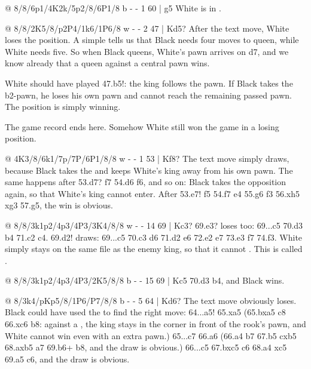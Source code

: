 @ 8/8/6p1/4K2k/5p2/8/6P1/8 b - - 1 60 | g5
White is in .

@ 8/8/2K5/8/p2P4/1k6/1P6/8 w - - 2 47 | Kd5?
After the text move, White loses the position. A simple 
tells us that Black needs four moves to queen, while White needs five. So when Black queens, White's
pawn arrives on d7, and we know already that a queen against a central pawn wins.

White should have played 47.\K b5!: the king follows the pawn. If Black takes the b2-pawn, he loses
his own pawn and cannot reach the remaining passed pawn. The position is simply winning.

The game record ends here. Somehow White still won the game in a losing position.

@ 4K3/8/6k1/7p/7P/6P1/8/8 w - - 1 53 | Kf8?
The text move simply draws, because Black takes the
 and keeps White's king away from his own
pawn. The same happens after 53.\K d7? \K f7 54.\K d6 \K f6, and so on: Black takes the opposition
again, so that White's king cannot enter. After 53.\K e7! \K f5 54.\K f7 \K e4 55.\K g6 \K f3
56.\K xh5 \K xg3 57.\K g5, the win is obvious.

@ 8/8/3k1p2/4p3/4P3/3K4/8/8 w - - 14 69 | Kc3?
69.\K e3? loses too: 69...\K c5 70.\K d3 \K b4 71.\K c2 \K c4. 69.\K d2! draws: 69...\K c5 70.\K c3
\K d6 71.\K d2 \K e6 72.\K e2 \K e7 73.\K e3 \K f7 74.\K f3. White simply stays on the same file as
the enemy king, so that it cannot . This is called
.

@ 8/8/3k1p2/4p3/4P3/2K5/8/8 b - - 15 69 | Kc5
70.\K d3 \K b4, and Black wins.

@ 8/3k4/pKp5/8/1P6/P7/8/8 b - - 5 64 | Kd6?
The text move obviously loses. Black could have used the
 to find the right move:
64...a5! 65.\K xa5 (65.bxa5 \K c8 66.\K xc6 \K b8: against a , the king stays in the corner in front of the
rook's pawn, and White cannot win even with an extra pawn.) 65...\K c7 66.\K a6 (66.a4 \K b7 67.b5
cxb5 68.axb5 \K a7 69.b6+ \K b8, and the draw is obvious.) 66...c5 67.bxc5 \K c6 68.a4 \K xc5 69.a5
\K c6, and the draw is obvious.

